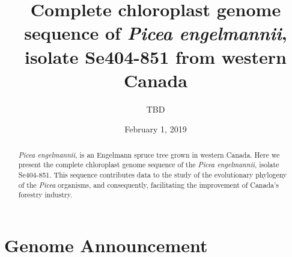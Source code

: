 \documentclass[titlepage,11pt, oneside]{article}   	%
\title{\textbf{Complete chloroplast genome sequence of \textit{Picea engelmannii}, isolate Se404-851 from western Canada\newline}}
\author{TBD}
\date{February 1, 2019}
\begin{document}
\maketitle
\begin{abstract}
\textit{Picea engelmannii}, is an Engelmann spruce tree grown in western Canada. Here we present the complete chloroplast genome sequence of the \textit{Picea engelmannii}, isolate Se404-851. This sequence contributes data to the study of the evolutionary phylogeny of the \textit{Picea} organisms, and consequently, facilitating the improvement of Canada’s forestry industry.
\end{abstract}

\section*{Genome Announcement}
\end{document}
